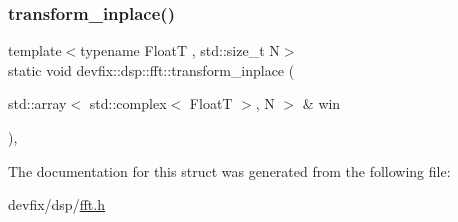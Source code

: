 \mbox{\label{structdevfix_1_1dsp_1_1fft_a56cf2ee0f12d0a4c4bdcded3db38e088}} 
\subsubsection{\texorpdfstring{transform\+\_\+inplace()}{transform\_inplace()}\hspace{0.1cm}{\footnotesize\ttfamily [3/3]}}
{\footnotesize\ttfamily template$<$typename FloatT , std\+::size\+\_\+t N$>$ \\
static void devfix\+::dsp\+::fft\+::transform\+\_\+inplace (\begin{DoxyParamCaption}\item[{std\+::array$<$ std\+::complex$<$ FloatT $>$, N $>$ \&}]{win }\end{DoxyParamCaption})\hspace{0.3cm}{\ttfamily [inline]}, {\ttfamily [static]}}



The documentation for this struct was generated from the following file\+:\begin{DoxyCompactItemize}
\item 
devfix/dsp/\hyperlink{fft_8h}{fft.\+h}\end{DoxyCompactItemize}
